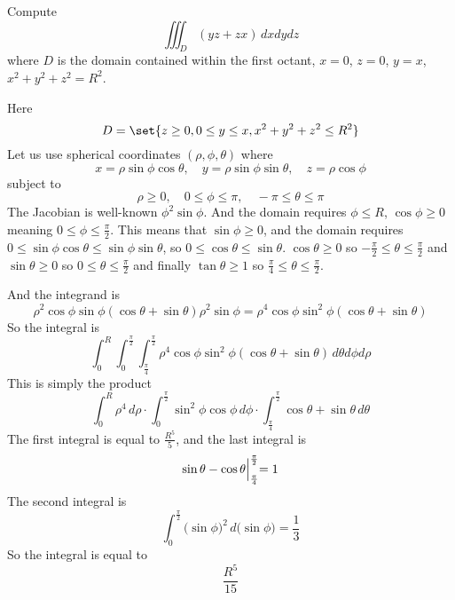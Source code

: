 \documentclass[10pt]{article}
\def\bexerc{\begin{exercise*}}
\def\eexerc{\end{exercise*}}
\def\bblank{\begin{blankpp}}
\def\eblank{\end{blankpp}}
\begin{document}
\bexerc
    Compute
    \[ \iiint_D(yz+zx)\,dxdydz \]
    where $D$ is the domain contained within the first octant, $x=0$, $z=0$, $y=x$, $x^2+y^2+z^2=R^2$.
\eexerc

\bblank
    Here
    \[ D = \set{z\geq0, 0\leq y\leq x, x^2+y^2+z^2\leq R^2} \]
    Let us use spherical coordinates $(\rho, \phi, \theta)$ where
    \[ x = \rho\sin\phi\cos\theta,\quad y=\rho\sin\phi\sin\theta,\quad z=\rho\cos\phi \]
    subject to
    \[ \rho\geq0,\quad 0\leq\phi\leq\pi,\quad -\pi\leq\theta\leq\pi \]
    The Jacobian is well-known $\phi^2\sin\phi$.
    And the domain requires $\phi\leq R$, $\cos\phi\geq0$ meaning $0\leq\phi\leq\frac\pi2$.
    This means that $\sin\phi\geq0$, and the domain requires $0\leq\sin\phi\cos\theta\leq\sin\phi\sin\theta$, so $0\leq\cos\theta\leq\sin\theta$.
    $\cos\theta\geq0$ so $-\frac\pi2\leq\theta\leq\frac\pi2$ and $\sin\theta\geq0$ so $0\leq\theta\leq\frac\pi2$ and finally $\tan\theta\geq1$ so $\frac\pi4\leq\theta\leq\frac\pi2$.

    And the integrand is
    \[ \rho^2\cos\phi\sin\phi(\cos\theta+\sin\theta)\rho^2\sin\phi = \rho^4\cos\phi\sin^2\phi(\cos\theta+\sin\theta) \]
    So the integral is
    \[ \int_0^R\int_0^{\frac\pi2}\int_{\frac\pi4}^{\frac\pi2}\rho^4\cos\phi\sin^2\phi(\cos\theta+\sin\theta)\,d\theta d\phi d\rho \]
    This is simply the product
    \[ \int_0^R\rho^4\,d\rho\cdot\int_0^{\frac\pi2}\sin^2\phi\cos\phi\,d\phi\cdot\int_{\frac\pi4}^{\frac\pi2}\cos\theta+\sin\theta\,d\theta \]
    The first integral is equal to $\frac{R^5}5$, and the last integral is
    \[ \sin\theta - \cos\theta\Bigl|_{\frac\pi4}^{\frac\pi2} = 1 \]
    The second integral is
    \[ \int_0^{\frac\pi2}\bigl(\sin\phi\bigr)^2\,d\bigl(\sin\phi\bigr) = \frac13 \]
    So the integral is equal to
    \[ \frac{R^5}{15} \]

\eblank
\end{document}
